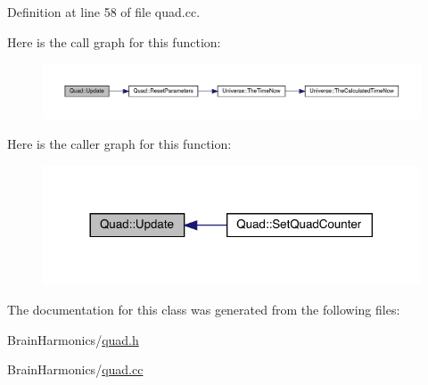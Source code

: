 Definition at line 58 of file quad.\+cc.

Here is the call graph for this function\+:
\nopagebreak
\begin{figure}[H]
\begin{center}
\leavevmode
\includegraphics[width=350pt]{class_quad_a0710e6a7d77a34fdadbd2c36d03ade62_cgraph}
\end{center}
\end{figure}
Here is the caller graph for this function\+:
\nopagebreak
\begin{figure}[H]
\begin{center}
\leavevmode
\includegraphics[width=317pt]{class_quad_a0710e6a7d77a34fdadbd2c36d03ade62_icgraph}
\end{center}
\end{figure}


The documentation for this class was generated from the following files\+:\begin{DoxyCompactItemize}
\item 
Brain\+Harmonics/\hyperlink{quad_8h}{quad.\+h}\item 
Brain\+Harmonics/\hyperlink{quad_8cc}{quad.\+cc}\end{DoxyCompactItemize}
